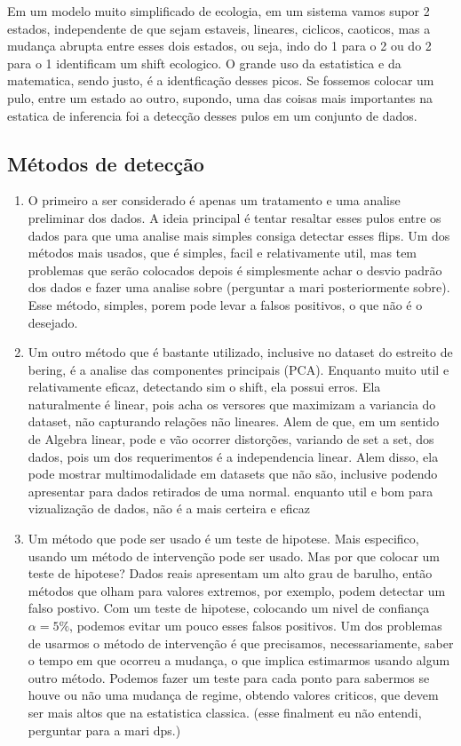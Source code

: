 Em um modelo muito simplificado de ecologia, em um sistema vamos supor 2 estados, independente de
que sejam estaveis, lineares, ciclicos, caoticos, mas a mudança abrupta entre esses dois estados, ou
seja, indo do 1 para o 2 ou do 2 para o 1 identificam um shift ecologico. O grande uso da
estatistica e da matematica, sendo justo, é a identficação desses picos. Se fossemos colocar um
pulo, entre um estado ao outro, supondo, uma das coisas mais importantes na estatica de inferencia
foi a detecção desses pulos em um conjunto de dados.

\subsection{Métodos de detecção}
\begin{enumerate}
    \item O primeiro a ser considerado é apenas um tratamento e uma analise preliminar dos dados. A
    ideia principal é tentar resaltar esses pulos entre os dados para que uma analise mais simples
    consiga detectar esses flips. Um dos métodos mais usados, que é simples, facil e relativamente
    util, mas tem problemas que serão colocados depois é simplesmente achar o desvio padrão dos
    dados e fazer uma analise sobre (perguntar a mari posteriormente sobre). Esse método, simples,
    porem pode levar a falsos positivos, o que não é o desejado.
    
    \item Um outro método que é bastante utilizado, inclusive no dataset do estreito de bering, é a
    analise das componentes principais (PCA). Enquanto muito util e relativamente eficaz, detectando
    sim o shift, ela possui erros. Ela naturalmente é linear, pois acha os versores que maximizam a
    variancia do dataset, não capturando relações não lineares. Alem de que, em um sentido de
    Algebra linear, pode e vão ocorrer distorções, variando de set a set, dos dados, pois um dos
    requerimentos é a independencia linear. Alem disso, ela pode mostrar multimodalidade em datasets
    que não são, inclusive podendo apresentar para dados retirados de uma normal. enquanto util e
    bom para vizualização de dados, não é a mais certeira e eficaz
    
    \item Um método que pode ser usado é um teste de hipotese. Mais especifico, usando um método de
    intervenção pode ser usado. Mas por que colocar um teste de hipotese? Dados reais apresentam um
    alto grau de barulho, então métodos que olham para valores extremos, por exemplo, podem detectar
    um falso postivo. Com um teste de hipotese, colocando um nivel de confiança \(\alpha =5\% \),
    podemos evitar um pouco esses falsos positivos. Um dos problemas de usarmos o método de
    intervenção é que precisamos, necessariamente, saber o tempo em que ocorreu a mudança, o que
    implica estimarmos usando algum outro método. Podemos fazer um teste para cada ponto para
    sabermos se houve ou não uma mudança de regime, obtendo valores criticos, que devem ser mais
    altos que na estatistica classica. (esse finalment eu não entendi, perguntar para a mari dps.)
\end{enumerate}

